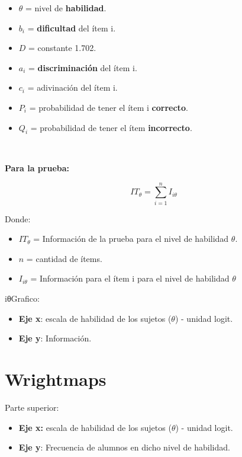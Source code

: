 \documentclass[
  letterpaper,
  DIV=11,
  numbers=noendperiod]{scrreprt}
\begin{document}
\begin{longtable}[]
\begin{minipage}[t]{\linewidth}
\begin{itemize}
\item
  \(\theta\) = nivel de \textbf{habilidad}.
\item
  \(b_i\) = \textbf{dificultad} del ítem i.
\item
  \(D\) = constante 1.702.
\item
  \(a_i\) = \textbf{discriminación} del ítem i.
\item
  \(c_i\) = adivinación del ítem i.
\item
  \(P_i\) = probabilidad de tener el ítem i \textbf{correcto}.
\item
  \(Q_i\) = probabilidad de tener el ítem \textbf{incorrecto}.
\end{itemize}
\end{minipage} \\
\end{longtable}

\textbf{Para la prueba:}

\[
IT_\theta = \sum_{i=1}^n I_{i\theta} 
\]

Donde:

\begin{itemize}
\item
  \(IT_\theta\) = Información de la prueba para el nivel de habilidad
  \(\theta\).
\item
  \(n\) = cantidad de ítems.
\item
  \(I_{i\theta}\) = Información para el ítem i para el nivel de
  habilidad \(\theta\)
\end{itemize}

iθGrafico:

\begin{itemize}
\item
  \textbf{Eje x}: escala de habilidad de los sujetos (\(\theta\)) -
  unidad logit.
\item
  \textbf{Eje y}: Información.
\end{itemize}

\section{Wrightmaps}\label{wrightmaps}

Parte superior:

\begin{itemize}
\item
  \textbf{Eje x:} escala de habilidad de los sujetos (\(\theta\)) -
  unidad logit.
\item
  \textbf{Eje y}: Frecuencia de alumnos en dicho nivel de habilidad.
\end{itemize}
\end{document}
